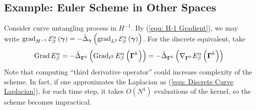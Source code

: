 \documentclass[../dissertation.tex]{subfiles}
\begin{document}
\subsection{Example: Euler Scheme in Other Spaces}
\label{sct: Example: Euler Scheme in Other Spaces}
Consider curve untangling process in $H^{-1}$.
By (\ref{equ: H-1 Gradient}), we may write $\operatorname{grad}_{H^{-1}} \mathcal{E}_{\beta}^{\alpha} \left( \boldsymbol{\gamma} \right) = - \tilde{\Delta}_{\boldsymbol{\gamma}} \left( \operatorname{grad}_{L^2} \mathcal{E}_{\beta}^{\alpha} \left( \boldsymbol{\gamma} \right)\right)$.
For the discrete equivalent, take
\begin{equation}
    \operatorname{Grad} E_{\beta}^{\alpha} = - \tilde{\Delta}_{\boldsymbol{\Gamma}^k} \left( \operatorname{Grad}_{\ell^2} E_{\beta}^{\alpha} \left( \boldsymbol{\Gamma}^k \right) \right) = - \tilde{\Delta}_{\boldsymbol{\Gamma}^k} \left( \nabla_{\boldsymbol{\Gamma}^k} E_{\beta}^{\alpha} \left( \boldsymbol{\Gamma}^k \right) \right)
\end{equation}
Note that computing ``third derivative operator'' %
could increase complexity of the scheme.
In fact, if one approximates the Laplacian as (\ref{equ: Discrete Curve Laplacian}), 
for each time step, it takes $O \left( N^4 \right)$ evaluations of the kernel, so the scheme becomes impractical.
\end{document}
